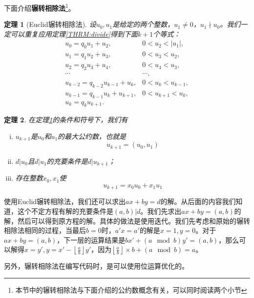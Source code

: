 \documentclass{ctexrep}
\newcommand{\bbold}[1]{\textbf{#1}}
\newcommand{\aabs}[1]{{ \left| #1 \right| }}
\newcommand{\ffloor}[1]{{ \left\lfloor #1 \right\rfloor }}
\newtheorem{thrm}{定理}[section]
\begin{document}
下面介绍\bbold{辗转相除法}\footnote{本节中的辗转相除法与下面介绍的公约数概念有关，可以同时阅读两个小节}。
\begin{thrm}[Euclid辗转相除法]\label{THRM:euclid}
设$u_0,u_1$是给定的两个整数，$u_1 \neq 0$，$u_1 \nmid u_0$。我们一定可以重复应用定理\ref{THRM:divide}得到下面$k+1$个等式：
\begin{equation}
\begin{array}{ll}
u_0 = q_0  u_1 +u_2 ,    &  0 < u_2 < \aabs{u_1} ,\\
u_1 = q_1  u_2 +u_3 ,    &  0 < u_3 < u_2 ,       \\
u_2 = q_2  u_3 +u_4 ,    &  0 < u_4 < u_3 ,       \\
\cdots                   &  \cdots        ,       \\
u_{k-2} = q_{k-2} u_{k-1} +u_k ,    &  0 < u_k < u_{k-1} ,   \\
u_{k-1} = q_{k-1}  u_k +u_{k+1} ,    &  0 < u_{k+1} < u_k ,   \\
u_k = q_k  u_{k+1} .    & 
\end{array}
\end{equation}
\end{thrm}

\begin{thrm}\label{THRM:euclid_p}
在定理\ref{THRM:euclid}的条件和符号下，我们有
\begin{enumerate}[(i)]
\item $u_{k+1}$是$u_0$和$u_1$的最大公约数，也就是
\begin{equation}
u_{k+1}=(u_0,u_1)
\end{equation}
\item $d|u_0$且$d|u_1$的充要条件是$d|u_{k+1}$；
\item 存在整数$x_0,x_1$使
\begin{equation}
u_{k+1}=x_0 u_0 +x_1 u_1
\end{equation}
\end{enumerate}
\end{thrm}

使用Euclid辗转相除法，我们还可以求出$ax+by=d$的解。从后面的内容我们知道，这个不定方程有解的充要条件是$(a,b)|d$。我们先求出$ax+by=(a,b)$的解，然后可以得到原方程的解。具体的做法是使用迭代。我们先考虑和原始的辗转相除法相同的过程，当最后$b=0$时，$a'x=a'$的解是$x=1, y=0$。对于$ax+by=(a,b)$，下一层的运算结果是$bx'+(a\mod b)y'=(a,b)$，那么可以解得$x=y',y=x'-\ffloor{\frac{a}{b}}y'$，因为$\ffloor{\frac{a}{b}}\times b+(a\mod b)=a$。

另外，辗转相除法在编写代码时，是可以使用位运算优化的。
\end{document}
